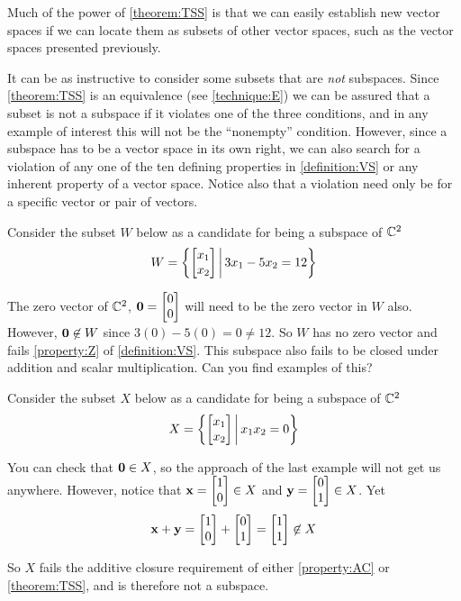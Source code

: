 \documentclass{ximera}
\begin{document}
Much of the power of \ref{theorem:TSS} is that we can easily establish
new vector spaces if we can locate them as subsets of other vector
spaces, such as the vector spaces presented previously.

It can be as instructive to consider some subsets that are
\textit{not} subspaces.  Since \ref{theorem:TSS} is an equivalence
(see \ref{technique:E}) we can be assured that a subset is not a
subspace if it violates one of the three conditions, and in any
example of interest this will not be the ``nonempty'' condition.
However, since a subspace has to be a vector space in its own right,
we can also search for a violation of any one of the ten defining
properties in \ref{definition:VS} or any inherent property of a vector
space.  Notice also that a violation need only be for a specific
vector or pair of vectors.

\begin{example}

  Consider the subset $W$ below as a candidate for being a subspace of $\mathbb{C}^{2}$
  \[
    W=\left\lbrace\begin{bmatrix}x_1\\x_2\end{bmatrix}\,\middle|\,3x_1-5x_2=12\right\rbrace
  \]

  The zero vector of $\mathbb{C}^{2}$, $\mathbf{0}=\begin{bmatrix}0\\0\end{bmatrix}$
  will need to be the zero vector in $W$ also.  However,
  $\mathbf{0}\not\in W$ since $3(0)-5(0)=0\neq 12$.  So $W$ has no
  zero vector and fails \ref{property:Z} of \ref{definition:VS}.  This
  subspace also fails to be closed under addition and scalar
  multiplication.  Can you find examples of this?
\end{example}

\begin{example}
  
  Consider the subset $X$ below as a candidate for being a subspace of $\mathbb{C}^{2}$
  \[
    X=\left\lbrace\begin{bmatrix}x_1\\x_2\end{bmatrix}\,\middle|\,x_1x_2=0\right\rbrace
  \]

  You can check that $\mathbf{0}\in X$, so the approach of the last
  example will not get us anywhere.  However, notice that
  $\mathbf{x}=\begin{bmatrix}1\\0\end{bmatrix}\in X$ and
  $\mathbf{y}=\begin{bmatrix}0\\1\end{bmatrix}\in X$.  Yet
  \[
    \mathbf{x}+\mathbf{y}=\begin{bmatrix}1\\0\end{bmatrix}+\begin{bmatrix}0\\1\end{bmatrix}=\begin{bmatrix}1\\1\end{bmatrix}\not\in X
  \]

  So $X$ fails the additive closure requirement of either
  \ref{property:AC} or \ref{theorem:TSS}, and is therefore not a
  subspace.
\end{example}
\end{document}
